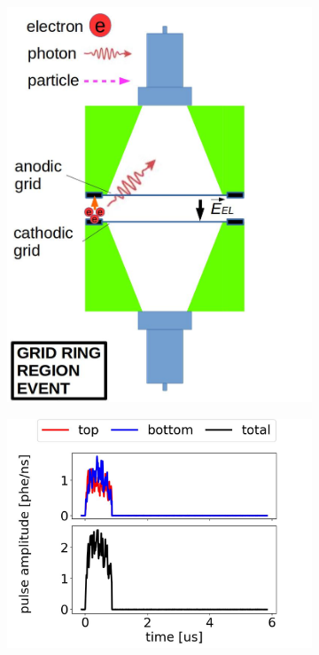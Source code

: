 \begin{figure}[!htbp]
	\centering
	\begin{subfigure}[b]{.8\textwidth}
		\centering
		\includegraphics[width=\halfwidth,clip,trim={0 0 0 0},angle=0,origin=c]{Figures/GasTest/WeiDrawEvent/RingPhoto.jpg}
		\caption{}
		\label{fig:}
	\end{subfigure}
	\par\bigskip
	\begin{subfigure}[b]{0.7\textwidth}
		\centering
		\includegraphics[width=\figurewidth,clip,trim={0 0 0 0}]{Figures/GasTest/exampleWaveforms/proc64767id00000181.jpg}

\end{subfigure}
\end{figure}
